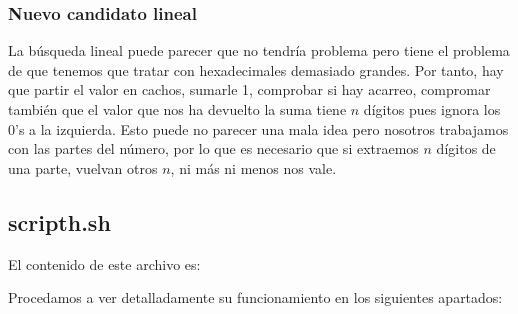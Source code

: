 \documentclass[a4paper, 11pt]{article}
\begin{document}
		\subsubsection{Nuevo candidato lineal}
			La búsqueda lineal puede parecer que no tendría problema pero tiene el problema de que tenemos que tratar con
			hexadecimales demasiado grandes. Por tanto, hay que partir el valor en cachos, sumarle 1, comprobar si hay acarreo,
			compromar también que el valor que nos ha devuelto la suma tiene $n$ dígitos pues ignora los 0's a la izquierda.
			Esto puede no parecer una mala idea pero nosotros trabajamos con las partes del número, por lo que es necesario
			que si extraemos $n$ dígitos de una parte, vuelvan otros $n$, ni más ni menos nos vale.
		
	\subsection{scripth.sh}
		El contenido de este archivo es:

		\begin{scriptsize}
		
		\end{scriptsize}
		
		Procedamos a ver detalladamente su funcionamiento en los siguientes apartados:
		
\end{document}
